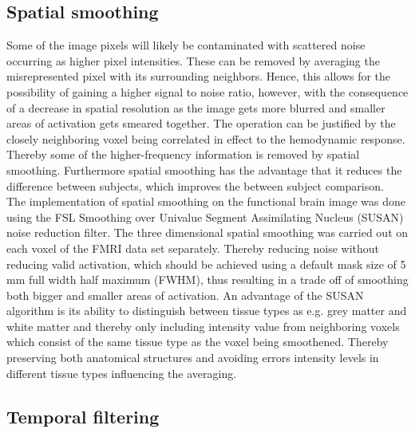 %
%

\subsection{Spatial smoothing}

Some of the image pixels will likely be contaminated with scattered noise occurring as higher pixel intensities. These can be removed by averaging the misrepresented pixel with its surrounding neighbors. Hence, this allows for the possibility of gaining a higher signal to noise ratio, however, with the consequence of a decrease in spatial resolution as the image gets more blurred and smaller areas of activation gets smeared together. The operation can be justified by the closely neighboring voxel being correlated in effect to the hemodynamic response. Thereby some of the higher-frequency information is removed by spatial smoothing. Furthermore spatial smoothing has the advantage that it reduces the difference between subjects, which improves the between subject comparison. \cite{Poldrack2011} \\
The implementation of spatial smoothing on the functional brain image was done using the FSL Smoothing over Univalue Segment Assimilating Nucleus (SUSAN) noise reduction filter. The three dimensional spatial smoothing was carried out on each voxel of the FMRI data set separately. Thereby reducing noise without reducing valid activation, which should be achieved using a default mask size of 5 mm full width half maximum (FWHM), thus resulting in a trade off of smoothing both bigger and smaller areas of activation. An advantage of the SUSAN algorithm is its ability to distinguish between tissue types as e.g. grey matter and white matter and thereby only including intensity value from neighboring voxels which consist of the same tissue type as the voxel being smoothened. Thereby preserving both anatomical structures and avoiding errors intensity levels in different tissue types influencing the averaging. \cite{Smith1997}  


\subsection{Temporal filtering}

